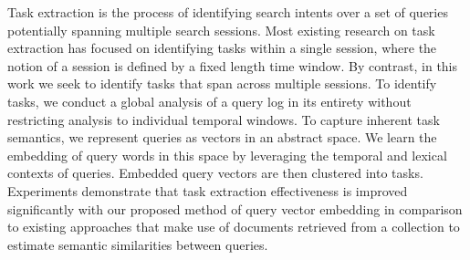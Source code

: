 Task extraction is the process of identifying search intents over a set of queries potentially spanning multiple search sessions. Most existing research on task extraction has focused on identifying tasks within a single session, where the notion of a session is defined by a fixed length time window. By contrast, in this work we seek to identify tasks that span across multiple sessions. To identify tasks, we conduct a global analysis of a query log in its entirety without restricting analysis to individual temporal windows. To capture inherent task semantics, we represent queries as vectors in an abstract space. We learn the embedding of query words in this space by leveraging the temporal and lexical contexts of queries. Embedded query vectors are then clustered into tasks. Experiments demonstrate that task extraction effectiveness is improved significantly with our proposed method of query vector embedding in comparison to existing approaches that make use of documents retrieved from a collection to estimate semantic similarities between queries.
